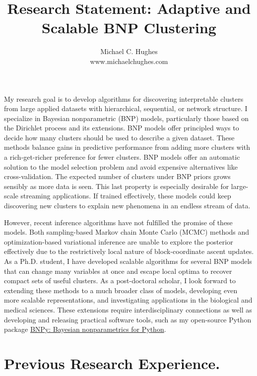 \documentclass[11pt,letterpaper,sans]{article}
\title{Research Statement: Adaptive and Scalable BNP Clustering}
\author{Michael C. Hughes \\ www.michaelchughes.com}
\begin{document}
\maketitle

My research goal is to develop algorithms for discovering interpretable clusters from large applied datasets with hierarchical, sequential, or network structure. 
I specialize in Bayesian nonparametric (BNP) models, particularly those based on the Dirichlet process and its extensions. BNP models offer principled ways to decide how many clusters should be used to describe a given dataset. These methods balance gains in predictive performance from adding more clusters with a rich-get-richer preference for fewer clusters. BNP models offer an automatic solution to the model selection problem and avoid expensive alternatives like cross-validation. 
The expected number of clusters under BNP priors grows sensibly as more data is seen. This last property is especially desirable for large-scale streaming applications. If trained effectively, these models could keep discovering new clusters to explain new phenomena in an endless stream of data.

However, recent inference algorithms have not fulfilled the promise of these models. Both sampling-based Markov chain Monte Carlo (MCMC) methods and optimization-based variational inference are unable to explore the posterior effectively due to the restrictively local nature of block-coordinate ascent updates. As a Ph.D. student, I have developed scalable algorithms for several BNP models that can change many variables at once and escape local optima to recover compact sets of useful clusters. As a post-doctoral scholar, I look forward to extending these methods to a much broader class of models, developing even more scalable representations, and investigating applications in the biological and medical sciences. These extensions require interdisciplinary connections as well as developing and releasing practical software tools, such as my open-source Python package \href{http://bitbucket.org/michaelchughes/bnpy-dev}{BNPy: Bayesian nonparametrics for Python}.

\section{Previous Research Experience.}
\end{document}
